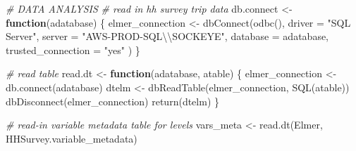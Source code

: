 \documentclass[
  12pt,
]{article}
\newenvironment{Shaded}{\begin{snugshade}}{\end{snugshade}}
\newcommand{\AttributeTok}[1]{\textcolor[rgb]{0.77,0.63,0.00}{#1}}
\newcommand{\CommentTok}[1]{\textcolor[rgb]{0.56,0.35,0.01}{\textit{#1}}}
\newcommand{\ControlFlowTok}[1]{\textcolor[rgb]{0.13,0.29,0.53}{\textbf{#1}}}
\newcommand{\FunctionTok}[1]{\textcolor[rgb]{0.00,0.00,0.00}{#1}}
\newcommand{\NormalTok}[1]{#1}
\newcommand{\OtherTok}[1]{\textcolor[rgb]{0.56,0.35,0.01}{#1}}
\newcommand{\SpecialCharTok}[1]{\textcolor[rgb]{0.00,0.00,0.00}{#1}}
\newcommand{\StringTok}[1]{\textcolor[rgb]{0.31,0.60,0.02}{#1}}
\begin{document}
\begin{Shaded}
\begin{Highlighting}[]
\CommentTok{\# DATA ANALYSIS}
\CommentTok{\# read in hh survey trip data}
\NormalTok{db.connect }\OtherTok{\textless{}{-}} \ControlFlowTok{function}\NormalTok{(adatabase) \{}
\NormalTok{  elmer\_connection }\OtherTok{\textless{}{-}} \FunctionTok{dbConnect}\NormalTok{(}\FunctionTok{odbc}\NormalTok{(),}
                                \AttributeTok{driver =} \StringTok{"SQL Server"}\NormalTok{,}
                                \AttributeTok{server =} \StringTok{"AWS{-}PROD{-}SQL}\SpecialCharTok{\textbackslash{}\textbackslash{}}\StringTok{SOCKEYE"}\NormalTok{,}
                                \AttributeTok{database =}\NormalTok{ adatabase,}
                                \AttributeTok{trusted\_connection =} \StringTok{"yes"}
\NormalTok{  )}
\NormalTok{\}}

\CommentTok{\# read table}
\NormalTok{read.dt }\OtherTok{\textless{}{-}} \ControlFlowTok{function}\NormalTok{(adatabase, atable) \{}
\NormalTok{  elmer\_connection }\OtherTok{\textless{}{-}} \FunctionTok{db.connect}\NormalTok{(adatabase)}
\NormalTok{  dtelm }\OtherTok{\textless{}{-}} \FunctionTok{dbReadTable}\NormalTok{(elmer\_connection, }\FunctionTok{SQL}\NormalTok{(atable))}
  \FunctionTok{dbDisconnect}\NormalTok{(elmer\_connection)}
  \FunctionTok{return}\NormalTok{(dtelm)}
\NormalTok{\}}

\CommentTok{\# read{-}in variable metadata table for levels}
\NormalTok{vars\_meta }\OtherTok{\textless{}{-}} \FunctionTok{read.dt}\NormalTok{(}\StringTok{\textquotesingle{}Elmer\textquotesingle{}}\NormalTok{, }\StringTok{\textquotesingle{}HHSurvey.variable\_metadata\textquotesingle{}}\NormalTok{)}



\end{Highlighting}
\end{Shaded}
\end{document}
